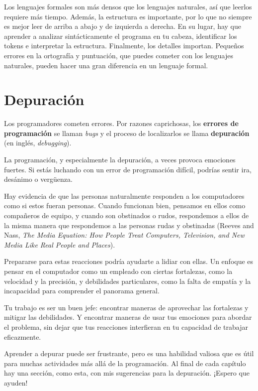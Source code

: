 \documentclass[10pt]{book}
\begin{document}
Los lenguajes formales son más densos
que los lenguajes naturales, así que leerlos requiere más tiempo.  Además, la
estructura es importante, por lo que no siempre es mejor leer
de arriba a abajo y de izquierda a derecha.  En su lugar, hay que aprender a analizar
sintácticamente el programa en tu cabeza, identificar los tokens e interpretar
la estructura.  Finalmente, los detalles importan.  Pequeños errores en
la ortografía y puntuación, que puedes cometer
con los lenguajes naturales, pueden hacer una gran diferencia en un lenguaje
formal.


\section{Depuración}

Los programadores cometen errores.  Por razones caprichosas, los {\bf errores
de programación} se llaman {\em bugs} y el proceso de localizarlos se llama
{\bf depuración} (en inglés, {\em debugging}).

La programación, y especialmente la depuración, a veces provoca emociones
fuertes.  Si estás luchando con un error de programación difícil, podrías
sentir ira, desánimo o vergüenza.

Hay evidencia de que las personas naturalmente responden a los computadores
como si estos fueran personas.  Cuando funcionan bien, pensamos en ellos como
compañeros de equipo, y cuando son obstinados o rudos, respondemos a ellos
de la misma manera que respondemos a las personas rudas
y obstinadas (Reeves and Nass, {\it The Media
    Equation: How People Treat Computers, Television, and New Media
    Like Real People and Places}).

Prepararse para estas reacciones podría ayudarte a lidiar con ellas.
Un enfoque es pensar en el computador como un empleado con
ciertas fortalezas, como la velocidad y la precisión, y
debilidades particulares, como la falta de empatía y la incapacidad
para comprender el panorama general.

Tu trabajo es ser un buen jefe: encontrar maneras de aprovechar las
fortalezas y mitigar las debilidades.  Y encontrar maneras
de usar tus emociones para abordar el problema,
sin dejar que tus reacciones interfieran en tu capacidad
de trabajar eficazmente.

Aprender a depurar puede ser frustrante, pero es una habilidad valiosa
que es útil para muchas actividades más allá de la programación.  Al final
de cada capítulo hay una sección, como esta,
con mis sugerencias para la depuración.  ¡Espero que ayuden!
\end{document}
